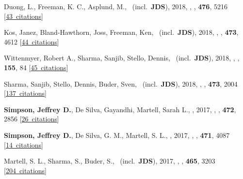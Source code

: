\item[{\color{numcolor}\scriptsize16}] Duong, L., Freeman, K. C., Asplund, M., \etal\ (incl.\ \textbf{JDS}), 2018, , \mnras, \textbf{476}, 5216 [\href{https://ui.adsabs.harvard.edu/#abs/2018MNRAS.476.5216D}{43~citations}]

\item[{\color{numcolor}\scriptsize15}] Kos, Janez, Bland-Hawthorn, Joss, Freeman, Ken, \etal\ (incl.\ \textbf{JDS}), 2018, , \mnras, \textbf{473}, 4612 [\href{https://ui.adsabs.harvard.edu/#abs/2018MNRAS.473.4612K}{44~citations}]

\item[{\color{numcolor}\scriptsize14}] Wittenmyer, Robert A., Sharma, Sanjib, Stello, Dennis, \etal\ (incl.\ \textbf{JDS}), 2018, , \aj, \textbf{155}, 84 [\href{https://ui.adsabs.harvard.edu/#abs/2018AJ....155...84W}{45~citations}]

\item[{\color{numcolor}\scriptsize13}] Sharma, Sanjib, Stello, Dennis, Buder, Sven, \etal\ (incl.\ \textbf{JDS}), 2018, , \mnras, \textbf{473}, 2004 [\href{https://ui.adsabs.harvard.edu/#abs/2018MNRAS.473.2004S}{137~citations}]

\item[{\color{numcolor}\scriptsize12}] \textbf{Simpson, Jeffrey D.}, De Silva, Gayandhi, Martell, Sarah L., \etal, 2017, , \mnras, \textbf{472}, 2856 [\href{https://ui.adsabs.harvard.edu/#abs/2017MNRAS.472.2856S}{26~citations}]

\item[{\color{numcolor}\scriptsize11}] \textbf{Simpson, Jeffrey D.}, De Silva, G. M., Martell, S. L., \etal, 2017, , \mnras, \textbf{471}, 4087 [\href{https://ui.adsabs.harvard.edu/#abs/2017MNRAS.471.4087S}{14~citations}]

\item[{\color{numcolor}\scriptsize10}] Martell, S. L., Sharma, S., Buder, S., \etal\ (incl.\ \textbf{JDS}), 2017, , \mnras, \textbf{465}, 3203 [\href{https://ui.adsabs.harvard.edu/#abs/2017MNRAS.465.3203M}{204~citations}]

